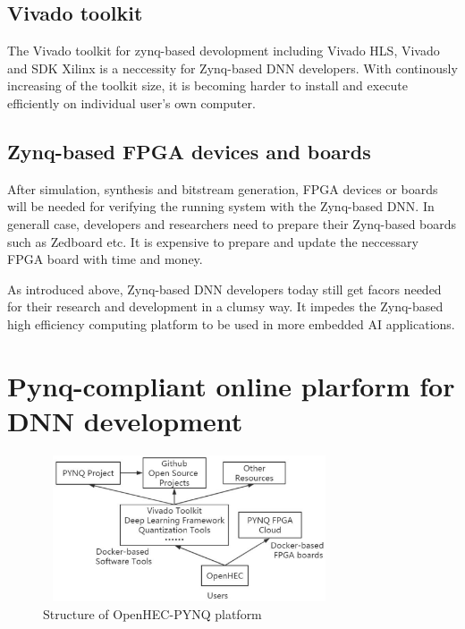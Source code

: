 \subsection{Vivado toolkit}
The Vivado toolkit for zynq-based devolopment including Vivado HLS, Vivado and SDK Xilinx is a neccessity for Zynq-based DNN developers. With continously increasing of the toolkit size, it is becoming harder to install and execute efficiently on individual user's own computer.

\subsection{Zynq-based FPGA devices and boards}
After simulation, synthesis and bitstream generation, FPGA devices or boards will be needed for verifying the running system with the Zynq-based DNN. In generall case, developers and researchers need to prepare their Zynq-based boards such as Zedboard etc. It is expensive to prepare and update the neccessary FPGA board with time and money.

As introduced above, Zynq-based DNN developers today still get facors needed for their research and development in a clumsy way. It impedes the Zynq-based high efficiency computing platform to be used in more embedded AI applications. 

\section{Pynq-compliant online plarform for DNN development}

\begin{figure}
\includegraphics[height=1.7in, width=3.4in]{openhec}
\caption{Structure of OpenHEC-PYNQ platform}
\end{figure}

